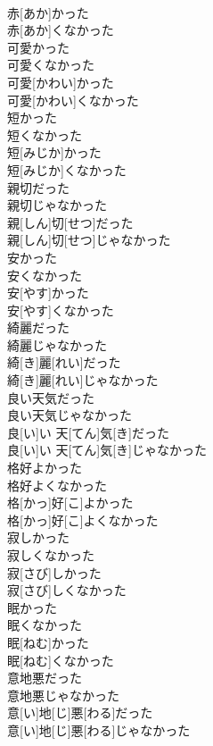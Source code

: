 \documentclass[8pt]{extreport}
\begin{document}
\begin{CJK}{UTF8}{min}
\\	赤[あか]かった 
\\	赤[あか]くなかった
\\	可愛かった 
\\	可愛くなかった	
\\	可愛[かわい]かった 
\\	可愛[かわい]くなかった
\\	短かった 
\\	短くなかった	
\\	短[みじか]かった 
\\	短[みじか]くなかった
\\	親切だった 
\\	親切じゃなかった	
\\	親[しん]切[せつ]だった 
\\	親[しん]切[せつ]じゃなかった
\\	安かった 
\\	安くなかった	
\\	安[やす]かった 
\\	安[やす]くなかった
\\	綺麗だった 
\\	綺麗じゃなかった	
\\	綺[き]麗[れい]だった 
\\	綺[き]麗[れい]じゃなかった
\\	良い天気だった 
\\	良い天気じゃなかった	
\\	良[い]い 天[てん]気[き]だった 
\\	良[い]い 天[てん]気[き]じゃなかった
\\	格好よかった 
\\	格好よくなかった	
\\	格[かっ]好[こ]よかった 
\\	格[かっ]好[こ]よくなかった
\\	寂しかった 
\\	寂しくなかった	
\\	寂[さび]しかった 
\\	寂[さび]しくなかった
\\	眠かった 
\\	眠くなかった	
\\	眠[ねむ]かった 
\\	眠[ねむ]くなかった
\\	意地悪だった 
\\	意地悪じゃなかった	
\\	意[い]地[じ]悪[わる]だった 
\\	意[い]地[じ]悪[わる]じゃなかった

\end{CJK}
\end{document}
